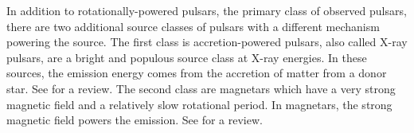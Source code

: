 In addition to rotationally-powered pulsars, the primary class of
observed pulsars, there are two additional source classes of pulsars
with a different mechanism powering the source.  The first class is
accretion-powered pulsars, also called X-ray pulsars, are a bright
and populous source class at X-ray energies. In these sources, the
emission energy comes from the accretion of matter from a donor star. See
\cite{caballero_2012a_x-ray-pulsars:} for a review.  The second class
are magnetars which have a very strong magnetic field and a relatively
slow rotational period. In magnetars, the strong magnetic field powers
the emission.  See \cite{rea_2011a_magnetar-outbursts:} for a review.
